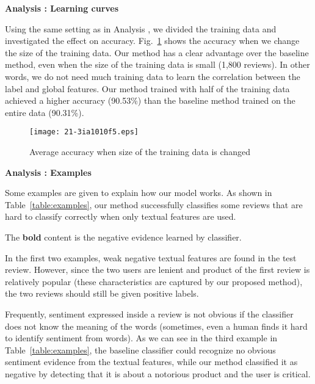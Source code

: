 \documentclass[english]{jnlp_1.4}
\begin{document}
\noindent
\textbf{Analysis {}: Learning curves}

Using the same setting as in Analysis {}, we divided the training data and investigated the effect on accuracy.
Fig.~\ref{fig:train} shows the accuracy when we change the size of the training data. 
Our method has a clear advantage over the baseline method, even when the size of the training data is small (1,800 reviews).
In other words, we do not need much training data to learn the correlation between the label and global features.
Our method trained with half of the training data achieved a higher accuracy (90.53\%) than the baseline method trained on the entire data (90.31\%).

\begin{figure}[t]
\begin{center}
\texttt{[image: 21-3ia1010f5.eps]}
\end{center}
\caption{Average accuracy when size of the training data is changed}
\label{fig:train}
\end{figure}


\noindent
\textbf{Analysis {}: Examples}

Some examples are given to explain how our model works.
As shown in Table~\ref{table:examples},  our method  successfully classifies some reviews that are  hard to  classify correctly when only textual features are used.

\begin{table}[t]
\label{table:examples}

\small
The {\bf bold} content is the negative evidence learned by classifier.
\par
\end{table}

In the first two examples, weak negative textual features are found in the test review.
However, since the two users are lenient  and product of the first review is relatively popular (these characteristics are captured by our proposed method), the two reviews should still be given positive labels.

Frequently, sentiment expressed inside a review is not obvious if the classifier does not know the meaning of the words (sometimes, even a human finds it hard to identify sentiment from words). 
As we can see in the third example in Table~\ref{table:examples}, the baseline classifier could recognize no obvious sentiment evidence from the textual features, 
while our method classified it as negative by detecting that it is about a notorious product and the user is critical.
\end{document}
